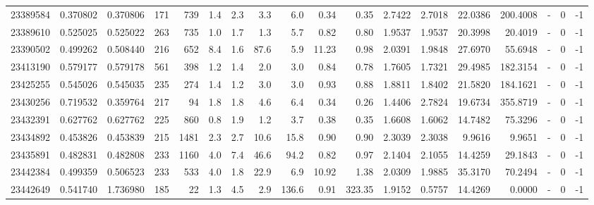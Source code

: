 \begin{tabular}{rrrrrrrrrrrrrrrlrr}
  23389584 & 0.370802 &   0.370806 &  171 &  739 &      1.4 &      2.3 &     3.3 &      6.0 &       0.34 &        0.35 &  2.7422 &  2.7018 &   22.0386 &  200.4008 &             - &        0 &         -1 \\
  23389610 & 0.525025 &   0.525022 &  263 &  735 &      1.0 &      1.7 &     1.3 &      5.7 &       0.82 &        0.80 &  1.9537 &  1.9537 &   20.3998 &   20.4019 &             - &        0 &         -1 \\
  23390502 & 0.499262 &   0.508440 &  216 &  652 &      8.4 &      1.6 &    87.6 &      5.9 &      11.23 &        0.98 &  2.0391 &  1.9848 &   27.6970 &   55.6948 &             - &        0 &         -1 \\
  23413190 & 0.579177 &   0.579178 &  561 &  398 &      1.2 &      1.4 &     2.0 &      3.0 &       0.84 &        0.78 &  1.7605 &  1.7321 &   29.4985 &  182.3154 &             - &        0 &         -1 \\
  23425255 & 0.545026 &   0.545035 &  235 &  274 &      1.4 &      1.2 &     3.0 &      3.0 &       0.93 &        0.88 &  1.8811 &  1.8402 &   21.5820 &  184.1621 &             - &        0 &         -1 \\
  23430256 & 0.719532 &   0.359764 &  217 &   94 &      1.8 &      1.8 &     4.6 &      6.4 &       0.34 &        0.26 &  1.4406 &  2.7824 &   19.6734 &  355.8719 &             - &        0 &         -1 \\
  23432391 & 0.627762 &   0.627762 &  225 &  860 &      0.8 &      1.9 &     1.2 &      3.7 &       0.38 &        0.35 &  1.6608 &  1.6062 &   14.7482 &   75.3296 &             - &        0 &         -1 \\
  23434892 & 0.453826 &   0.453839 &  215 & 1481 &      2.3 &      2.7 &    10.6 &     15.8 &       0.90 &        0.90 &  2.3039 &  2.3038 &    9.9616 &    9.9651 &             - &        0 &         -1 \\
  23435891 & 0.482831 &   0.482808 &  233 & 1160 &      4.0 &      7.4 &    46.6 &     94.2 &       0.82 &        0.97 &  2.1404 &  2.1055 &   14.4259 &   29.1843 &             - &        0 &         -1 \\
  23442384 & 0.499359 &   0.506523 &  233 &  533 &      4.0 &      1.8 &    22.9 &      6.9 &      10.92 &        1.38 &  2.0309 &  1.9885 &   35.3170 &   70.2494 &             - &        0 &         -1 \\
  23442649 & 0.541740 &   1.736980 &  185 &   22 &      1.3 &      4.5 &     2.9 &    136.6 &       0.91 &      323.35 &  1.9152 &  0.5757 &   14.4269 &    0.0000 &             - &        0 &         -1 \\

\end{tabular}
